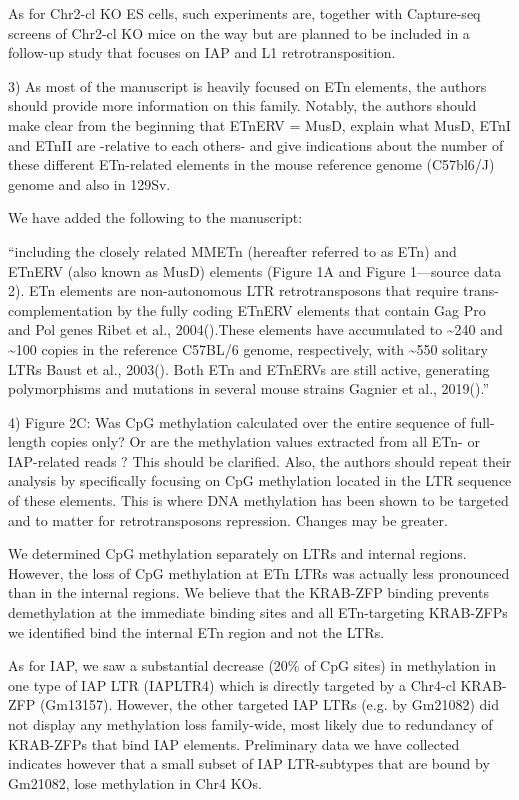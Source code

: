 \documentclass[11pt,a4paper]{article}
\begin{document}
As for Chr2-cl KO ES cells, such experiments are, together with Capture-seq screens of Chr2-cl KO mice on the way but are planned to be included in a follow-up study that focuses on IAP and L1 retrotransposition.

3) As most of the manuscript is heavily focused on ETn elements, the authors should provide more information on this family. Notably, the authors should make clear from the beginning that ETnERV = MusD, explain what MusD, ETnI and ETnII are -relative to each others- and give indications about the number of these different ETn-related elements in the mouse reference genome (C57bl6/J) genome and also in 129Sv.

We have added the following to the manuscript:

“including the closely related MMETn (hereafter referred to as ETn) and ETnERV (also known as MusD) elements (Figure 1A and Figure 1—source data 2). ETn elements are non-autonomous LTR retrotransposons that require trans-complementation by the fully coding ETnERV elements that contain Gag Pro and Pol genes Ribet et al., 2004().These elements have accumulated to \textasciitilde{}240 and \textasciitilde{}100 copies in the reference C57BL/6 genome, respectively, with \textasciitilde{}550 solitary LTRs Baust et al., 2003(). Both ETn and ETnERVs are still active, generating polymorphisms and mutations in several mouse strains Gagnier et al., 2019().”

4) Figure 2C: Was CpG methylation calculated over the entire sequence of full-length copies only? Or are the methylation values extracted from all ETn- or IAP-related reads ? This should be clarified. Also, the authors should repeat their analysis by specifically focusing on CpG methylation located in the LTR sequence of these elements. This is where DNA methylation has been shown to be targeted and to matter for retrotransposons repression. Changes may be greater.

We determined CpG methylation separately on LTRs and internal regions. However, the loss of CpG methylation at ETn LTRs was actually less pronounced than in the internal regions. We believe that the KRAB-ZFP binding prevents demethylation at the immediate binding sites and all ETn-targeting KRAB-ZFPs we identified bind the internal ETn region and not the LTRs.

As for IAP, we saw a substantial decrease (20\% of CpG sites) in methylation in one type of IAP LTR (IAPLTR4) which is directly targeted by a Chr4-cl KRAB-ZFP (Gm13157). However, the other targeted IAP LTRs (e.g. by Gm21082) did not display any methylation loss family-wide, most likely due to redundancy of KRAB-ZFPs that bind IAP elements. Preliminary data we have collected indicates however that a small subset of IAP LTR-subtypes that are bound by Gm21082, lose methylation in Chr4 KOs.
\end{document}
